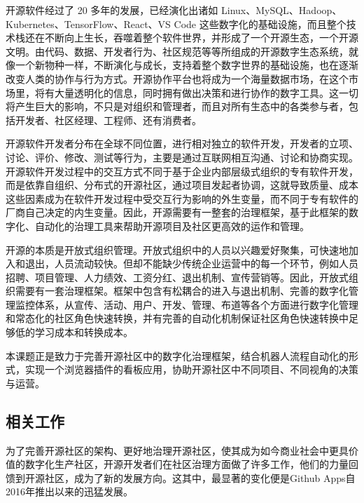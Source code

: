 \par 开源软件经过了 20 多年的发展，已经演化出诸如 Linux、MySQL、Hadoop、Kubernetes、TensorFlow、React、VS Code 这些数字化的基础设施，而且整个技术栈还在不断向上生长，吞噬着整个软件世界，并形成了一个开源生态，一个开源文明。由代码、数据、开发者行为、社区规范等等所组成的开源数字生态系统，就像一个新物种一样，不断演化与成长，支持着整个数字世界的基础设施，也在逐渐改变人类的协作与行为方式。开源协作平台也将成为一个海量数据市场，在这个市场里，将有大量透明化的信息，同时拥有做出决策和进行协作的数字工具。这一切将产生巨大的影响，不只是对组织和管理者，而且对所有生态中的各类参与者，包括开发者、社区经理、工程师、还有消费者。

\par 开源软件开发者分布在全球不同位置，进行相对独立的软件开发，开发者的立项、讨论、评价、修改、测试等行为，主要是通过互联网相互沟通、讨论和协商实现。开源软件开发过程中的交互方式不同于基于企业内部层级式组织的专有软件开发，而是依靠自组织、分布式的开源社区，通过项目发起者协调，这就导致质量、成本这些因素成为在软件开发过程中受交互行为影响的外生变量，而不同于专有软件的厂商自己决定的内生变量。\cite{李其锋2014面向开源社区的开发者群体行为分析方法}因此，开源需要有一整套的治理框架，基于此框架的数字化、自动化的治理工具来帮助开源项目及社区更高效的运作和管理。

\par 开源的本质是开放式组织管理。开放式组织中的人员以兴趣爱好聚集，可快速地加入和退出，人员流动较快。但却不能缺少传统企业运营中的每一个环节，例如人员招聘、项目管理、人力绩效、工资分红、退出机制、宣传营销等。因此，开放式组织需要有一套治理框架。框架中包含有松耦合的进入与退出机制、完善的数字化管理监控体系，从宣传、活动、用户、开发、管理、布道等各个方面进行数字化管理和常态化的社区角色快速转换，并有完善的自动化机制保证社区角色快速转换中足够低的学习成本和转换成本。

\par 本课题正是致力于完善开源社区中的数字化治理框架，结合机器人流程自动化的形式，实现一个浏览器插件的看板应用，协助开源社区中不同项目、不同视角的决策与运营。


\subsection{相关工作}
\par 为了完善开源社区的架构、更好地治理开源社区，使其成为如今商业社会中更具价值的数字化生产社区，开源开发者们在社区治理方面做了许多工作，他们的力量回馈到开源社区，成为了新的发展方向。这其中，最显著的变化便是Github Apps自2016年推出以来的迅猛发展。

